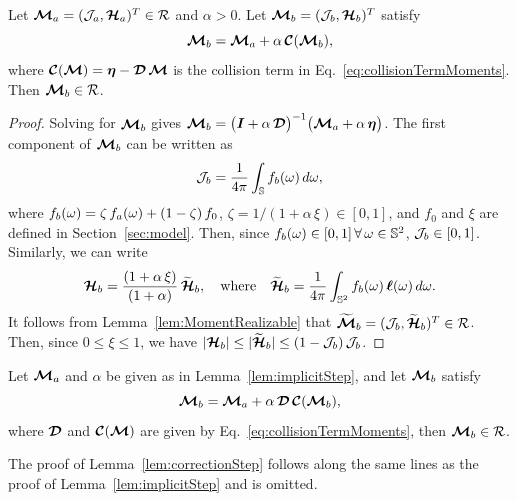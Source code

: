 \begin{lemma}
  Let $\boldsymbol{\mathcal{M}}_{a}=(\mathcal{J}_{a},\boldsymbol{\mathcal{H}}_{a})^{T}\in\mathcal{R}$ and $\alpha>0$.  
  Let $\boldsymbol{\mathcal{M}}_{b}=(\mathcal{J}_{b},\boldsymbol{\mathcal{H}}_{b})^{T}$ satisfy
  \begin{equation*}
    \boldsymbol{\mathcal{M}}_{b}=\boldsymbol{\mathcal{M}}_{a}+\alpha\,\boldsymbol{\mathcal{C}}(\boldsymbol{\mathcal{M}}_{b}), 
  \end{equation*}
  where $\boldsymbol{\mathcal{C}}(\boldsymbol{\mathcal{M}})=\boldsymbol{\eta}-\boldsymbol{\mathcal{D}}\,\boldsymbol{\mathcal{M}}$ is the collision term in Eq.~\eqref{eq:collisionTermMoments}.  
  Then $\boldsymbol{\mathcal{M}}_{b}\in\mathcal{R}$.  
  \label{lem:implicitStep}
\end{lemma}
\begin{proof}
  Solving for $\boldsymbol{\mathcal{M}}_{b}$ gives $\boldsymbol{\mathcal{M}}_{b} = \big(\boldsymbol{I}+\alpha\,\boldsymbol{\mathcal{D}}\big)^{-1}\big(\boldsymbol{\mathcal{M}}_{a}+\alpha\,\boldsymbol{\eta}\big)$.  
  The first component of $\boldsymbol{\mathcal{M}}_{b}$ can be written as
  \begin{equation*}
    \mathcal{J}_{b}=\frac{1}{4\pi}\int_{\mathbb{S}}f_{b}(\omega)\,d\omega,
  \end{equation*}
  where $f_{b}(\omega)=\zeta\,f_{a}(\omega)+(1-\zeta)\,f_{0}$, $\zeta=1/(1+\alpha\,\xi)\in[0,1]$, and $f_{0}$ and $\xi$ are defined in Section~\ref{sec:model}.  
  Then, since $f_{b}(\omega)\in[0,1]\,\forall\,\omega\in\mathbb{S}^{2}$, $\mathcal{J}_{b}\in[0,1]$.  
  Similarly, we can write
  \begin{equation*}
    \boldsymbol{\mathcal{H}}_{b}=\frac{(1+\alpha\,\xi)}{(1+\alpha)}\,\widetilde{\boldsymbol{\mathcal{H}}}_{b},
    \quad\text{where}\quad
    \widetilde{\boldsymbol{\mathcal{H}}}_{b}=\frac{1}{4\pi}\int_{\mathbb{S}^{2}}f_{b}(\omega)\,\boldsymbol{\ell}(\omega)\,d\omega.  
  \end{equation*}
  It follows from Lemma~\ref{lem:MomentRealizable} that $\widetilde{\boldsymbol{\boldsymbol{\mathcal{M}}}}_{b}=(\mathcal{J}_{b},\widetilde{\boldsymbol{\mathcal{H}}}_{b})^{T}\in\mathcal{R}$.  
  Then, since $0\le\xi\le1$, we have $|\boldsymbol{\mathcal{H}}_{b}|\le|\widetilde{\boldsymbol{\mathcal{H}}}_{b}|\le(1-\mathcal{J}_{b})\,\mathcal{J}_{b}$.  
\end{proof}

\begin{lemma}
  Let $\boldsymbol{\mathcal{M}}_{a}$ and $\alpha$ be given as in Lemma~\ref{lem:implicitStep}, and let $\boldsymbol{\mathcal{M}}_{b}$ satisfy
  \begin{equation*}
    \boldsymbol{\mathcal{M}}_{b}=\boldsymbol{\mathcal{M}}_{a}+\alpha\,\boldsymbol{\mathcal{D}}\,\boldsymbol{\mathcal{C}}(\boldsymbol{\mathcal{M}}_{b}),    
  \end{equation*}
  where $\boldsymbol{\mathcal{D}}$ and $\boldsymbol{\mathcal{C}}(\boldsymbol{\mathcal{M}})$ are given by Eq.~\eqref{eq:collisionTermMoments},  then $\boldsymbol{\mathcal{M}}_{b}\in\mathcal{R}$.  
  \label{lem:correctionStep}
\end{lemma}
The proof of Lemma~\ref{lem:correctionStep} follows along the same lines as the proof of Lemma~\ref{lem:implicitStep} and is omitted.  
